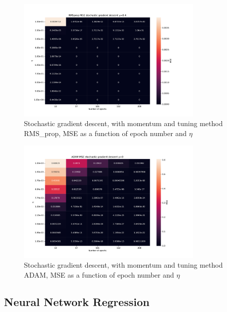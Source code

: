\begin{figure}[H]
\centering
\includegraphics[width=0.8\textwidth]{Figures/PartA/RMSprop_sgdm_MSE(eta,epochs)}
\caption{Stochastic gradient descent, with momentum and tuning method RMS_prop, MSE as a function of epoch number and \(\eta \)	 }
\label{fig:RMSprop_sgdm_MSE-eta-epochs-}
\end{figure}

\begin{figure}[H]
\centering
\includegraphics[width=0.8\textwidth]{Figures/PartA/ADAM_sgdm_MSE(eta,epochs)}
\caption{Stochastic gradient descent, with momentum and tuning method ADAM, MSE as a function of epoch number and \(\eta \)	 }
\label{fig:ADAM_sgdm_MSE-eta-epochs-}
\end{figure}


\subsection{Neural Network Regression}

